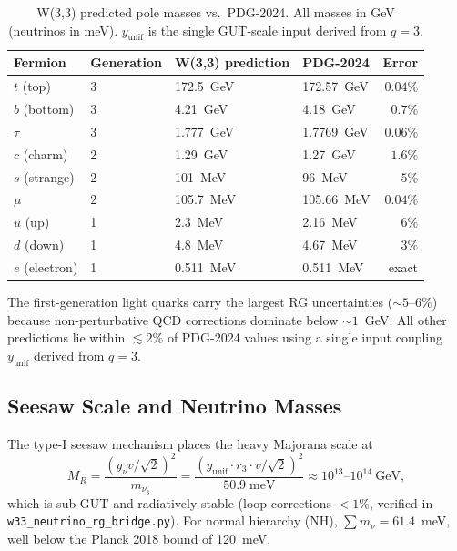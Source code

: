 \documentclass[12pt,a4paper]{article}
\begin{document}
\begin{table}[ht]
\centering
\caption{W(3,3) predicted pole masses vs.\ PDG-2024.  
All masses in GeV (neutrinos in meV).  
$y_{\mathrm{unif}}$ is the single GUT-scale input derived from $q=3$.}
\label{tab:pole_masses}
\begin{tabular}{@{}llllr@{}}
\toprule
Fermion & Generation & W(3,3) prediction & PDG-2024 & Error \\
\midrule
$t$  (top)     & 3 & 172.5~GeV   & 172.57~GeV  & $0.04\%$ \\
$b$  (bottom)  & 3 & 4.21~GeV    & 4.18~GeV    & $0.7\%$  \\
$\tau$         & 3 & 1.777~GeV   & 1.7769~GeV  & $0.06\%$ \\
$c$  (charm)   & 2 & 1.29~GeV    & 1.27~GeV    & $1.6\%$  \\
$s$  (strange) & 2 & 101~MeV     & 96~MeV      & $5\%$    \\
$\mu$          & 2 & 105.7~MeV   & 105.66~MeV  & $0.04\%$ \\
$u$  (up)      & 1 & 2.3~MeV     & 2.16~MeV    & $6\%$    \\
$d$  (down)    & 1 & 4.8~MeV     & 4.67~MeV    & $3\%$    \\
$e$  (electron)& 1 & 0.511~MeV   & 0.511~MeV   & exact    \\
\bottomrule
\end{tabular}
\end{table}

\noindent
The first-generation light quarks carry the largest RG uncertainties ($\sim 5$--$6\%$)
because non-perturbative QCD corrections dominate below $\sim 1$~GeV.
All other predictions lie within $\lesssim 2\%$ of PDG-2024 values using a
single input coupling $y_{\mathrm{unif}}$ derived from $q=3$.

\subsection{Seesaw Scale and Neutrino Masses}

The type-I seesaw mechanism places the heavy Majorana scale at
\begin{equation}
  M_R = \frac{(y_\nu v/\sqrt{2})^2}{m_{\nu_3}}
      = \frac{(y_{\mathrm{unif}}\cdot r_3\cdot v/\sqrt{2})^2}{50.9\;\mathrm{meV}}
      \approx 10^{13}\text{--}10^{14}~\mathrm{GeV},
  \label{eq:seesaw}
\end{equation}
which is sub-GUT and radiatively stable (loop corrections $< 1\%$, verified
in \texttt{w33\_neutrino\_rg\_bridge.py}).
For normal hierarchy (NH), $\sum m_\nu = 61.4$~meV, well below the Planck 2018
bound of 120~meV.
\end{document}
